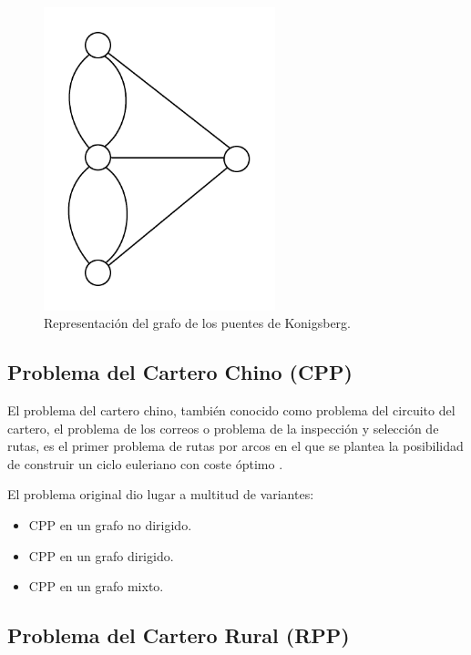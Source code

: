 \begin{figure}[H]
\centerline{\includegraphics[width=0.6\textwidth]{puentes_grafo.png}}
\caption{Representación del grafo de los puentes de Konigsberg.}
\label{fig:grafoPuentesKonigsberg}
\end{figure}

\subsection{Problema del Cartero Chino (CPP)}

El problema del cartero chino, también conocido como problema del circuito del cartero, el problema de los correos o problema de la inspección y selección de rutas, es el primer problema de rutas por arcos en el que se plantea la posibilidad de construir un ciclo euleriano con coste óptimo \citep{YordaPerez2014ElChino}. 

El problema original dio lugar a multitud de variantes:

\begin{itemize}
    \item CPP en un grafo no dirigido.
    \item CPP en un grafo dirigido.
    \item CPP en un grafo mixto.
\end{itemize}

\subsection{Problema del Cartero Rural (RPP)}

